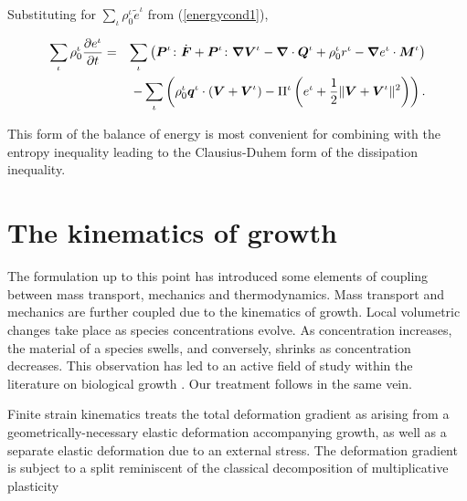 \noindent Substituting for $\sum\limits_\iota
\rho^\iota_0\tilde{e}^\iota$ from (\ref{energycond1}),

\begin{eqnarray}
\sum\limits_{\iota}\rho^\iota_0\frac{\partial e^\iota}{\partial t}
&=& \sum\limits_{\iota}\left(
\mbox{\boldmath$ P$}^\iota\colon\dot{\mbox{\boldmath$ F$}}+\mbox{\boldmath$ P$}^\iota\colon\mbox{\boldmath$\nabla$}\mbox{\boldmath$ V$}^\iota -
\mbox{\boldmath$\nabla$}\cdot\mbox{\boldmath$ Q$}^\iota +\rho_0^\iota r^\iota- \mbox{\boldmath$\nabla$}
e^\iota\cdot\mbox{\boldmath$ M$}^\iota\right)\nonumber\\
&&-
\sum\limits_{\iota}\left(\rho_0^\iota\mbox{\boldmath$ q$}^\iota\cdot(\mbox{\boldmath$ V$}+\mbox{\boldmath$ V$}^\iota)
- \Pi^\iota\left(e^\iota +
\frac{1}{2}\Vert\mbox{\boldmath$ V$}+\mbox{\boldmath$ V$}^\iota\Vert^2\right)\right).
\label{energybaltot1}
\end{eqnarray}

This form of the balance of energy is most convenient for
combining with the entropy inequality leading to the
Clausius-Duhem form of the dissipation inequality.

\section{The kinematics of growth}
\label{kinematics-of-growth}

The formulation up to this point has introduced some elements of
coupling between mass transport, mechanics and thermodynamics.
Mass transport and mechanics are further coupled due to the
kinematics of growth. Local volumetric changes take place as
species concentrations evolve. As concentration increases, the
material of a species swells, and conversely, shrinks as
concentration decreases. This observation has led to an active
field of study within the literature on biological growth
\citep{Skalak:81,SkalakHoger:96,TaberHumphrey:2001,LubardaHoger:02,AmbrosiMollica:2002}.
Our treatment follows in the same vein.

Finite strain kinematics treats the total deformation gradient as
arising from a geometrically-necessary elastic deformation
accompanying growth, as well as a separate elastic deformation due
to an external stress. The deformation gradient is subject to a
split reminiscent of the classical decomposition of multiplicative
plasticity \citep{Bilbyetal:1956,Lee:1969}

